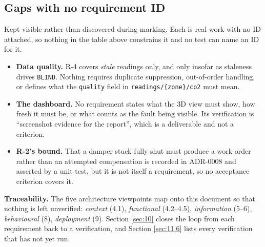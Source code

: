 \subsection{Gaps with no requirement ID}\label{sec:3.2}

Kept visible rather than discovered during marking. Each is real work with no ID attached, so
nothing in the table above constrains it and no test can name an ID for it.

\begin{itemize}
\tightlist
\item \textbf{Data quality.} R-4 covers \emph{stale} readings only, and only insofar as staleness
  drives \texttt{BLIND}. Nothing requires duplicate suppression, out-of-order handling, or defines
  what the \texttt{quality} field in \texttt{readings/\{zone\}/co2} must mean.
\item \textbf{The dashboard.} No requirement states what the 3D view must show, how fresh it must
  be, or what counts as the fault being visible. Its verification is ``screenshot evidence for the
  report'', which is a deliverable and not a criterion.
\item \textbf{R-2's bound.} That a damper stuck fully shut must produce a work order rather than an
  attempted compensation is recorded in ADR-0008 and asserted by a unit test, but it is not itself
  a requirement, so no acceptance criterion covers it.
\end{itemize}

\textbf{Traceability.} The five architecture viewpoints map onto this document so that nothing is
left unverified: \emph{context} (4.1), \emph{functional} (4.2–4.5), \emph{information} (5–6),
\emph{behavioural} (8), \emph{deployment} (9). Section \ref{sec:10} closes the loop from each requirement
back to a verification, and Section \ref{sec:11.6} lists every verification that has not yet run.\label{sec:3end}
